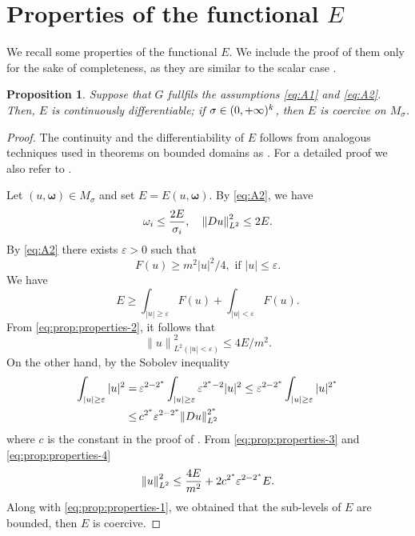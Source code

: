 \documentclass[a4paper,12pt,oneside]{amsart}
\newtheorem{prop}{Proposition}
\theoremstyle{definition}
\theoremstyle{remark}
\theoremstyle{theorem}
\begin{document}
\section{Properties of the functional $ E $}
We recall some properties of the functional $ E $. We include the
proof of them only for the sake of completeness, as they are
similar to the scalar case \cite{BBBM10}.
\begin{prop}
\label{prop:properties}
Suppose that $ {G} $ fullfils the assumptions \eqref{eq:A1} and
\eqref{eq:A2}. Then, $ E $ is continuously differentiable; if
$ {\sigma}\in (0,+\infty)\sp k $, then $ E $ is coercive on $ {M}_{\sigma} $.
\end{prop}
\begin{proof}
The continuity and the differentiability of $ E $ follows from analogous
techniques used in theorems on bounded domains as 
\cite[Theorem~2.2 and 2.6, p.\,16,17]{AP93}.
For a detailed proof we also refer to \cite[Proposition~2]{Gar11}.\par
Let $ (u,{\mathbf{\omega}})\in M_{\sigma} $ and set $ E = E(u,{\mathbf{\omega}}) $. By \eqref{eq:A2}, we have
\begin{align}
\label{eq:prop:properties-1}
{\mathbf{\omega}}_i \leq\frac{2E}{{\sigma}_i},\quad
{\|{{D} u}\|}_{L\sp 2} \sp 2\leq 2E.
\end{align}
By \eqref{eq:A2} there exists $ {\varepsilon} > 0 $ such that
\begin{equation}
\label{eq:prop:properties-2}
{F}(u)\geq m ^2 |u|^2 /4,\text{ if } |u|\leq{\varepsilon}.
\end{equation}
We have
\[
E\geq\int_{|u|\geq{\varepsilon}} {F}(u) + \int_{|u| < {\varepsilon}} {F}(u).
\]
From \eqref{eq:prop:properties-2}, it follows that
\begin{equation}
\label{eq:prop:properties-3}
{\|{u}\|}_{L^2 (|u| < {\varepsilon})} ^2\leq 4E/m ^2.
\end{equation}
On the other hand, by the Sobolev inequality
\begin{equation}
\label{eq:prop:properties-4}
\begin{split}
\int_{|u|\geq{\varepsilon}} |u|\sp 2 =&\,{\varepsilon}\sp{2 - 2\sp *}\int_{|u|\geq{\varepsilon}}
{\varepsilon}\sp{2\sp * - 2} |u|\sp 2\leq 
{\varepsilon}\sp{2 - 2\sp *} \int_{|u|\geq{\varepsilon}} |u|\sp{2\sp *}\\
\leq&\,c\sp{2\sp *} {\varepsilon}\sp{2 - 2\sp*}{\|{{D} u}\|}_{L\sp 2} \sp{2\sp *}
\end{split}
\end{equation}
where $ c $ is the constant in the proof of 
\cite[Th\'eor\`eme~IX.9,p.\,165]{Bre83}.
From \eqref{eq:prop:properties-3} and \eqref{eq:prop:properties-4}
\[
{\|{u}\|}\sp 2 _{L\sp 2}\leq 
\frac{4E}{m ^2} + 2 c\sp{2\sp *} {\varepsilon}\sp{2 - 2\sp*} E.
\]
Along with \eqref{eq:prop:properties-1}, we obtained that the
sub-levels of $ E $ are bounded, then $ E $ is coercive.
\end{proof}
\end{document}
